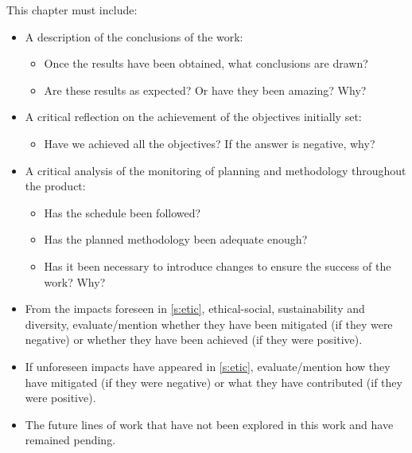 \documentclass[ENG]{TFUOC}%
\begin{document}
This chapter must include:
\begin{itemize}
\item A description of the conclusions of the work:
\begin{itemize}
    \item Once the results have been obtained, what conclusions are drawn?
    \item Are these results as expected? Or have they been amazing? Why?
\end{itemize}
\item A critical reflection on the achievement of the objectives initially set:
\begin{itemize}
    \item Have we achieved all the objectives? If the answer is negative, why?
\end{itemize}
\item A critical analysis of the monitoring of planning and methodology throughout the product:
\begin{itemize}
    \item Has the schedule been followed?
    \item Has the planned methodology been adequate enough?
    \item Has it been necessary to introduce changes to ensure the success of the work? Why?
\end{itemize}
\item From the impacts foreseen in \ref{s:etic}, ethical-social, sustainability and diversity, evaluate/mention whether they have been mitigated (if they were negative) or whether they have been achieved (if they were positive). 
\item If unforeseen impacts have appeared in \ref{s:etic}, evaluate/mention how they have mitigated (if they were negative) or what they have contributed (if they were positive).
\item The future lines of work that have not been explored in this work and have remained pending.


\end{itemize}
\end{document}
